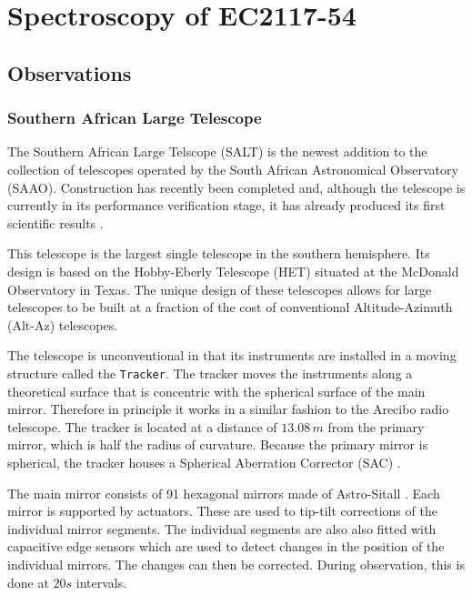 \chapter{Spectroscopy of EC2117-54}

\section{Observations}
\subsection{Southern African Large Telescope}
\label{SALT}

The Southern African Large Telscope (SALT) is the newest addition to the collection of telescopes operated by the South African Astronomical Observatory (SAAO). Construction has recently been completed and, although the telescope is currently in its performance verification stage, it has already produced its first scientific results \citep{salt_first_science}.

This telescope is the largest single telescope in the southern hemisphere. Its design is based on the Hobby-Eberly Telescope (HET) situated at the McDonald Observatory in Texas. The unique design of these telescopes allows for large telescopes to be built at a fraction of the cost of conventional Altitude-Azimuth (Alt-Az) telescopes. 

The telescope is unconventional in that its instruments are installed in a moving structure called the \texttt{Tracker}. The tracker moves the instruments along a theoretical surface that is concentric with the spherical surface of the main mirror. Therefore in principle it works in a similar fashion to the Arecibo radio telescope. The tracker is located at a distance of $13.08 \hspace{2pt}m$ from the primary mirror, which is half the radius of curvature. Because the primary mirror is spherical, the tracker houses a Spherical Aberration Corrector (SAC) \citep{dod2000}.

The main mirror consists of 91 hexagonal mirrors made of Astro-Sitall \citep{swiegers}. Each mirror is supported by  actuators. These are used to tip-tilt corrections of the individual mirror segments. The individual segments are also also fitted with capacitive edge sensors which are used to detect changes in the position of the individual mirrors. The changes can then be corrected. During observation, this is done at $20s$ intervals.

